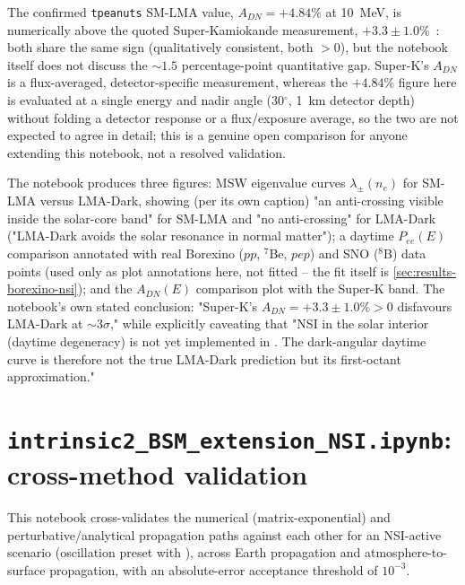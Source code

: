 \begin{notebox}
The confirmed \texttt{tpeanuts} SM-LMA value, $A_{DN}=+4.84\%$ at 10~MeV, is
numerically above the quoted Super-Kamiokande measurement,
$+3.3\pm1.0\%$~\parencite{Esteban2018LMADark}: both share the same sign
(qualitatively consistent, both $>0$), but the notebook itself does not
discuss the $\sim1.5$ percentage-point quantitative gap. Super-K's
$A_{DN}$ is a flux-averaged, detector-specific measurement, whereas the
$+4.84\%$ figure here is evaluated at a single energy and nadir angle
(30$^\circ$, 1~km detector depth) without folding a detector response or a
flux/exposure average, so the two are not expected to agree in detail; this
is a genuine open comparison for anyone extending this notebook, not a
resolved validation.
\end{notebox}

The notebook produces three figures: MSW eigenvalue curves
$\lambda_\pm(n_e)$ for SM-LMA versus LMA-Dark, showing (per its own caption)
"an anti-crossing visible inside the solar-core band" for SM-LMA and "no
anti-crossing" for LMA-Dark ("LMA-Dark avoids the solar resonance in normal
matter"); a daytime $P_{ee}(E)$ comparison annotated with real Borexino
($pp$, $^7$Be, $pep$) and SNO ($^8$B) data points (used only as plot
annotations here, not fitted -- the fit itself is
\cref{sec:results-borexino-nsi}); and the $A_{DN}(E)$ comparison plot with
the Super-K band. The notebook's own stated conclusion: "Super-K's
$A_{DN}=+3.3\pm1.0\%>0$ disfavours LMA-Dark at $\sim3\sigma$," while
explicitly caveating that "NSI in the solar interior (daytime degeneracy)
is not yet implemented in . The dark-angular
daytime curve is therefore not the true LMA-Dark prediction but its
first-octant approximation."

\section{\texttt{intrinsic2\_BSM\_extension\_NSI.ipynb}: cross-method validation}

\begin{implbox}
This notebook cross-validates the numerical (matrix-exponential) and
perturbative/analytical propagation paths against each other for an
NSI-active scenario (oscillation preset  with
), across Earth
propagation and atmosphere-to-surface propagation, with an absolute-error
acceptance threshold of $10^{-3}$.
\end{implbox}

